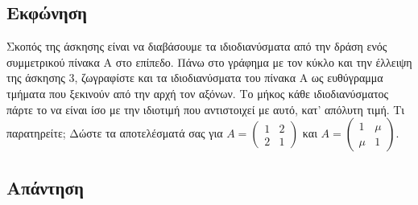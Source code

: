 \documentclass[a4paper,12pt]{article}
\begin{document}
\subsection{Εκφώνηση}
Σκοπός της άσκησης είναι να διαβάσουμε τα ιδιοδιανύσματα από την δράση ενός συμμετρικού πίνακα Α στο
επίπεδο. Πάνω στο γράφημα με τον κύκλο και την έλλειψη της άσκησης 3, ζωγραφίστε και τα ιδιοδιανύσματα
του πίνακα Α ως ευθύγραμμα τμήματα που ξεκινούν από την αρχή τον αξόνων. Το μήκος κάθε ιδιοδιανύσματος
πάρτε το να είναι ίσο με την ιδιοτιμή που αντιστοιχεί με αυτό, κατ' απόλυτη τιμή. Τι παρατηρείτε; Δώστε
τα αποτελέσματά σας για $
	A=\begin{pmatrix}
		1 & 2 \\
		2 & 1
	\end{pmatrix}
$ και $
	A=\begin{pmatrix}
		1   & \mu \\
		\mu & 1
	\end{pmatrix}
$.
\subsection{Απάντηση}
\end{document}
